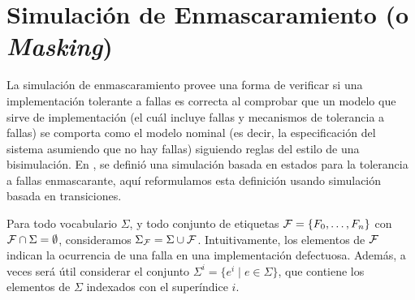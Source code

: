 \section{Simulación de Enmascaramiento (o \textit{Masking})}
\label{sec:masking_dist_mask}
La simulación de enmascaramiento provee una forma de verificar si una implementación tolerante a fallas es correcta al comprobar que un modelo que sirve de implementación (el cuál incluye fallas y mecanismos de tolerancia a fallas) se comporta como el modelo nominal (es decir, la especificación del sistema asumiendo que no hay fallas) siguiendo reglas del estilo de una bisimulación.
En \cite{DemasiCMA17}, se definió una simulación basada en estados para la tolerancia a fallas enmascarante, aquí reformulamos esta definición usando simulación basada en transiciones. 

Para todo vocabulario $\Sigma$, y todo conjunto de etiquetas $\mathcal{F} = \{F_0, \dots, F_n\}$ con $\mathcal{F} \cap \Sigma = \emptyset$, consideramos $\Sigma_{\mathcal{F}} = \Sigma \cup \mathcal{F}$. 
Intuitivamente, los elementos de $\mathcal{F}$ indican la ocurrencia de una falla en una implementación defectuosa. Además, a veces será útil considerar el conjunto $\Sigma^i = \{ e^i \mid e \in \Sigma\}$, que contiene los elementos de $\Sigma$ indexados con el superíndice $i$.


